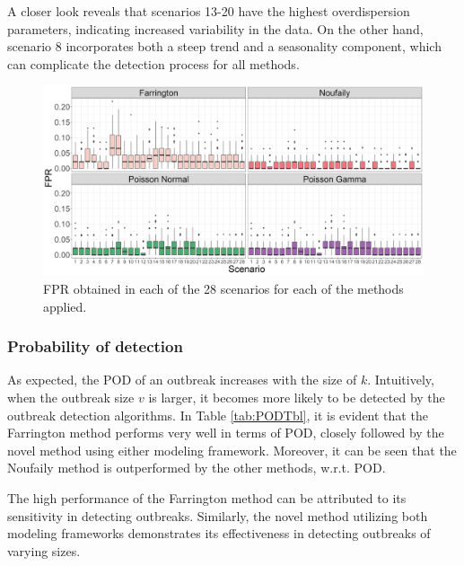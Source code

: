 \documentclass[preprint, 3p, authoryear]{elsarticle} %
\begin{document}
A closer look reveals that scenarios 13-20 have the highest overdispersion parameters, indicating increased variability in the data. On the other hand, scenario 8 incorporates both a steep trend and a seasonality component, which can complicate the detection process for all methods.



\begin{figure}[H]
\includegraphics[width=1\linewidth]{../../figures/FPRPlot} \caption{FPR obtained in each of the 28 scenarios for each of the methods applied.}\label{fig:FPR}
\end{figure}

\hypertarget{probability-of-detection}{%
\subsubsection{Probability of detection}\label{probability-of-detection}}

As expected, the POD of an outbreak increases with the size of \(k\). Intuitively, when the outbreak size \(v\) is larger, it becomes more likely to be detected by the outbreak detection algorithms. In Table \ref{tab:PODTbl}, it is evident that the Farrington method performs very well in terms of POD, closely followed by the novel method using either modeling framework. Moreover, it can be seen that the Noufaily method is outperformed by the other methods, w.r.t. POD.

The high performance of the Farrington method can be attributed to its sensitivity in detecting outbreaks. Similarly, the novel method utilizing both modeling frameworks demonstrates its effectiveness in detecting outbreaks of varying sizes.
\end{document}

